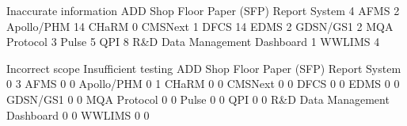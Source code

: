 \documentclass{article}
\begin{document}
\begin{Schunk}
\begin{Soutput}
                                           Inaccurate information
  ADD Shop Floor Paper (SFP) Report System                      4
  AFMS                                                          2
  Apollo/PHM                                                   14
  CHaRM                                                         0
  CMSNext                                                       1
  DFCS                                                         14
  EDMS                                                          2
  GDSN/GS1                                                      2
  MQA Protocol                                                  3
  Pulse                                                         5
  QPI                                                           8
  R&D Data Management Dashboard                                 1
  WWLIMS                                                        4
                                          
                                           Incorrect scope Insufficient testing
  ADD Shop Floor Paper (SFP) Report System               0                    3
  AFMS                                                   0                    0
  Apollo/PHM                                             0                    1
  CHaRM                                                  0                    0
  CMSNext                                                0                    0
  DFCS                                                   0                    0
  EDMS                                                   0                    0
  GDSN/GS1                                               0                    0
  MQA Protocol                                           0                    0
  Pulse                                                  0                    0
  QPI                                                    0                    0
  R&D Data Management Dashboard                          0                    0
  WWLIMS                                                 0                    0
                                          

\end{Soutput}
\end{Schunk}
\end{document}
